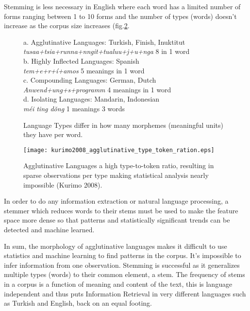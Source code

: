 \documentclass[runningheads,a4paper]{llncs}
\begin{document}
Stemming is less necessary in English where each word has a limited number of forms  ranging between 1 to 10 forms and the number of types (words) doesn't increase as the corpus size increases (fig.\ref{fig:typetokenratios}. 

\begin{figure}[thb]
	a. Agglutinative Languages: Turkish, Finish, Inuktitut\\
	\indent \textit{tusaa+tsia+runna+nngit+tualuu+j+u+nga} 8 in 1 word\\
	b. Highly Inflected Languages:	Spanish\\
	\textit{tem+e+r+\'{i}+amos} 5 meanings in 1 word \\
	c. Compounding Languages: German, Dutch \\
	\textit{Anwend+ung+s+programm} 4 meanings in 1 word \\
	d. Isolating Languages:	Mandarin, Indonesian\\
	\textit{m\'{e}i ting d\v{o}ng} 1 meanings 3 words
	\caption{Language Types differ in how many morphemes (meaningful units) they have per word.  }
	\label{fig:languagetypes}
\end{figure}




\begin{figure}[thb]
	\texttt{[image: kurimo2008\_agglutinative\_type\_token\_ration.eps]}
	\caption{Agglutinative Languages a high type-to-token ratio, resulting in sparse observations per type making statistical analysis nearly impossible (Kurimo 2008).}
	\label{fig:typetokenratios}
\end{figure}

In order to do any information extraction or natural language processing, a stemmer which reduces words to their stems must be used to make the feature space more dense so that patterns and statistically significant trends can be detected and machine learned.

In sum, the morphology of agglutinative languages makes it difficult to use statistics and machine learning to find patterns in the corpus. It's impossible to infer information from one observation. Stemming is successful as it generalizes multiple types (words) to their common  element, a stem. The frequency of stems in a corpus is a function of meaning and content of the text, this is language independent and thus puts Information Retrieval in very different languages such as Turkish and English, back on an equal footing. 
\end{document}
